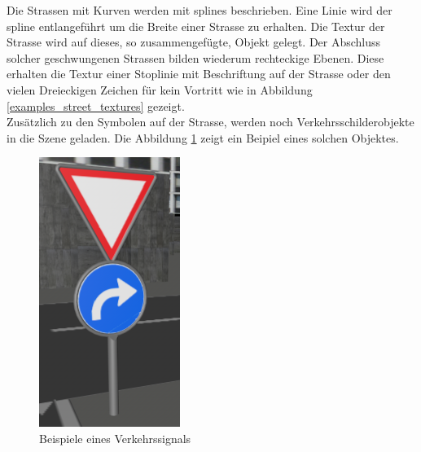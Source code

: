 Die Strassen mit Kurven werden mit \glspl{spline} beschrieben. Eine Linie wird der \gls{spline} entlangeführt um die Breite einer Strasse zu erhalten. Die Textur der Strasse wird auf dieses, so zusammengefügte, Objekt gelegt. Der Abschluss solcher geschwungenen Strassen bilden wiederum rechteckige Ebenen. Diese erhalten die Textur einer Stoplinie mit Beschriftung auf der Strasse oder den vielen Dreieckigen Zeichen für kein Vortritt wie in Abbildung \ref{examples_street_textures} gezeigt. \\
Zusätzlich zu den Symbolen auf der Strasse, werden noch Verkehrsschilderobjekte in die Szene geladen. Die Abbildung \ref{screenshot_trafficsignal} zeigt ein Beipiel eines solchen Objektes. \\
\begin{figure}[htbp]
\centering 
\includegraphics[scale=0.6]{src/screenshot_trafficsignal.png}
\caption{Beispiele eines Verkehrssignals} %
\label{screenshot_trafficsignal} %
\end{figure}

